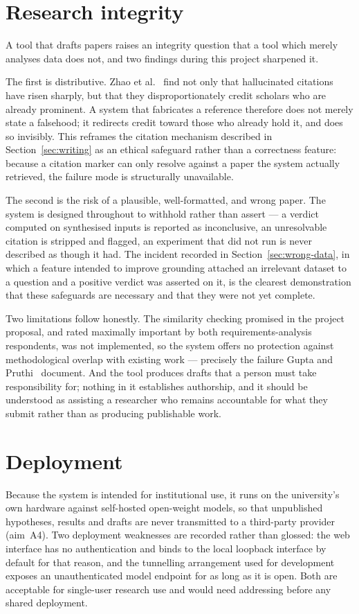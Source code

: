 \section{Research integrity}

A tool that drafts papers raises an integrity question that a tool which merely analyses data
does not, and two findings during this project sharpened it.

The first is distributive. Zhao et al.~\cite{zhao2026hallucinations} find not only that
hallucinated citations have risen sharply, but that they disproportionately credit scholars who
are already prominent. A system that fabricates a reference therefore does not merely state a
falsehood; it redirects credit toward those who already hold it, and does so invisibly. This
reframes the citation mechanism described in Section~\ref{sec:writing} as an ethical
safeguard rather than a correctness feature: because a citation marker can only resolve
against a paper the system actually retrieved, the failure mode is structurally unavailable.

The second is the risk of a plausible, well-formatted, and wrong paper. The system is designed
throughout to withhold rather than assert --- a verdict computed on synthesised inputs is
reported as inconclusive, an unresolvable citation is stripped and flagged, an experiment that
did not run is never described as though it had. The incident recorded in
Section~\ref{sec:wrong-data}, in which a feature intended to improve grounding attached an
irrelevant dataset to a question and a positive verdict was asserted on it, is the clearest
demonstration that these safeguards are necessary and that they were not yet complete.

Two limitations follow honestly. The similarity checking promised in the project proposal, and
rated maximally important by both requirements-analysis respondents, was not implemented, so
the system offers no protection against methodological overlap with existing work ---
precisely the failure Gupta and Pruthi~\cite{gupta2025glitters} document. And the tool
produces drafts that a person must take responsibility for; nothing in it establishes
authorship, and it should be understood as assisting a researcher who remains accountable for
what they submit rather than as producing publishable work.

\section{Deployment}

Because the system is intended for institutional use, it runs on the university's own
hardware against self-hosted open-weight models, so that unpublished hypotheses, results and
drafts are never transmitted to a third-party provider (aim~A4). Two deployment weaknesses are
recorded rather than glossed: the web interface has no authentication and binds to the local
loopback interface by default for that reason, and the tunnelling arrangement used for
development exposes an unauthenticated model endpoint for as long as it is open. Both are
acceptable for single-user research use and would need addressing before any shared
deployment.
